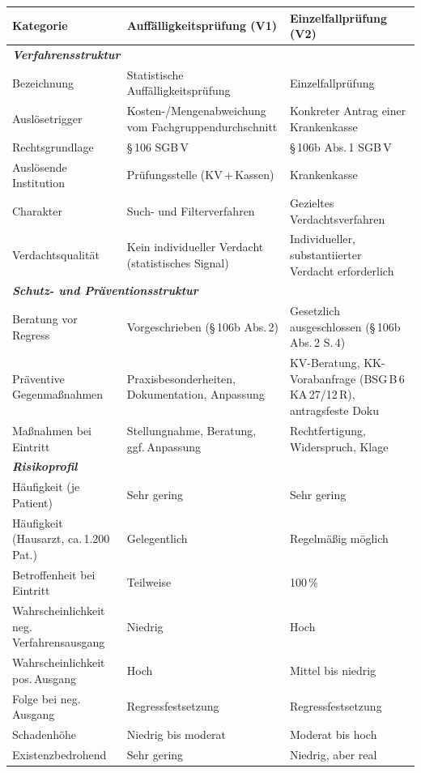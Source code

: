 \documentclass{umbruch-position}
\begin{document}
{\small
\begin{tabularx}{\textwidth}{p{3.8cm} X X}
\toprule
\textbf{Kategorie} & \textbf{Auffälligkeitsprüfung (V1)} & \textbf{Einzelfallprüfung (V2)} \\
\midrule
\multicolumn{3}{l}{\textit{\textbf{Verfahrensstruktur}}} \\
\addlinespace[2pt]
Bezeichnung & Statistische Auffälligkeitsprüfung & Einzelfallprüfung \\
\addlinespace
Auslösetrigger & Kosten-/Mengen\-abweichung vom Fachgruppen\-durch\-schnitt & Konkreter Antrag einer Krankenkasse \\
\addlinespace
Rechts\-grundlage & \S\,106 SGB\,V & \S\,106b Abs.\,1 SGB\,V \\
\addlinespace
Auslösende Institution & Prüfungsstelle (KV\,+\,Kassen) & Krankenkasse \\
\addlinespace
Charakter & Such- und Filterverfahren & Gezieltes Verdachtsverfahren \\
\addlinespace
Verdachts\-qualität & Kein individueller Verdacht (statistisches Signal) & Individueller, sub\-stantiierter Verdacht erforderlich \\
\midrule
\multicolumn{3}{l}{\textit{\textbf{Schutz- und Präventionsstruktur}}} \\
\addlinespace[2pt]
Beratung vor Regress & Vorgeschrieben (\S\,106b Abs.\,2) & Gesetzlich ausgeschlossen (\S\,106b Abs.\,2 S.\,4) \\
\addlinespace
Präventive Gegen\-maßnahmen & Praxisbesonder\-heiten, Doku\-mentation, Anpassung & KV-Beratung, KK-Vorab\-anfrage (BSG\,B\,6\,KA\,27/12\,R), antrags\-feste Doku \\
\addlinespace
Maßnahmen bei Eintritt & Stellungnahme, Beratung, ggf.\,Anpassung & Rechtfertigung, Widerspruch, Klage \\
\midrule
\multicolumn{3}{l}{\textit{\textbf{Risikoprofil}}} \\
\addlinespace[2pt]
Häufigkeit (je Patient) & Sehr gering & Sehr gering \\
\addlinespace
Häufigkeit (Haus\-arzt, ca.\,1.200 Pat.) & Gelegentlich & Regelmäßig möglich \\
\addlinespace
Betroffenheit bei Eintritt & Teilweise & 100\,\% \\
\addlinespace
Wahrscheinlichkeit neg.\,Verfahrens\-ausgang & Niedrig & Hoch \\
\addlinespace
Wahrscheinlichkeit pos.\,Ausgang & Hoch & Mittel bis niedrig \\
\addlinespace
Folge bei neg.\,Ausgang & Regressfestsetzung & Regressfestsetzung \\
\addlinespace
Schaden\-höhe & Niedrig bis moderat & Moderat bis hoch \\
\addlinespace
Existenz\-bedrohend & Sehr gering & Niedrig, aber real \\
\bottomrule
\end{tabularx}
}
\end{document}
